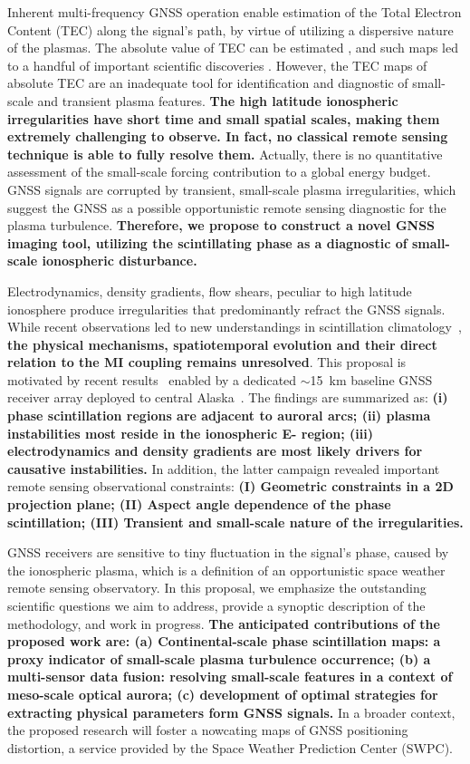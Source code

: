 \documentclass[letterpaper,12pt]{article}
\begin{document}
Inherent multi-frequency GNSS operation enable estimation of the Total Electron Content (TEC) along the signal's path, by virtue of utilizing a dispersive nature of the plasmas. The absolute value of TEC can be estimated \citep[e.g.][]{Rideout2006}, and such maps led to a handful of important scientific discoveries \citep[e.g.][]{Foster2002, Foster2005}. However, the TEC maps of absolute TEC are an inadequate tool for identification and diagnostic of small-scale and transient plasma features. \textbf{The high latitude ionospheric irregularities have short time and small spatial scales, making them extremely challenging to observe. In fact, no classical remote sensing technique is able to fully resolve them.} Actually, there is no quantitative assessment of the small-scale forcing contribution to a global energy budget. GNSS signals are corrupted by transient, small-scale plasma irregularities, which suggest the GNSS as a possible opportunistic remote sensing diagnostic for the plasma turbulence. \textbf{Therefore, we propose to construct a novel GNSS imaging tool, utilizing the scintillating phase as a diagnostic of small-scale ionospheric disturbance.}

Electrodynamics, density gradients, flow shears, peculiar to high latitude ionosphere produce irregularities that predominantly refract the GNSS signals. While recent observations led to new understandings in scintillation climatology~\citep{Spogli2009, Prikryl2011, Jiao2013}, \textbf{the physical mechanisms, spatiotemporal evolution and their direct relation to the MI coupling remains unresolved}. This proposal is motivated by recent results~\citep{Semeter2017, Mrak2018mahali} enabled by a dedicated $\sim$15~km baseline GNSS receiver array deployed to central Alaska~\citep{Viktor2014}. The findings are summarized as: \textbf{(i) phase scintillation regions are adjacent to auroral arcs; (ii) plasma instabilities most reside in the ionospheric E- region; (iii) electrodynamics and density gradients are most likely drivers for causative instabilities.} In addition, the latter campaign revealed important remote sensing observational constraints: \textbf{(I) Geometric constraints in a 2D projection plane; (II) Aspect angle dependence of the phase scintillation; (III) Transient and small-scale nature of the irregularities.} 

GNSS receivers are sensitive to tiny fluctuation in the signal's phase, caused by the ionospheric plasma, which is a definition of an opportunistic space weather remote sensing observatory. In this proposal, we emphasize the outstanding scientific questions we aim to address, provide a synoptic description of the methodology, and work in progress. \textbf{The anticipated contributions of the proposed work are: (a) Continental-scale phase scintillation maps: a proxy indicator of small-scale plasma turbulence occurrence; (b) a multi-sensor data fusion: resolving small-scale features in a context of meso-scale optical aurora; (c) development of optimal strategies for extracting physical parameters form GNSS signals.} In a broader context, the proposed research will foster a nowcating maps of GNSS positioning distortion, a service provided by the Space Weather Prediction Center (SWPC).
\end{document}
